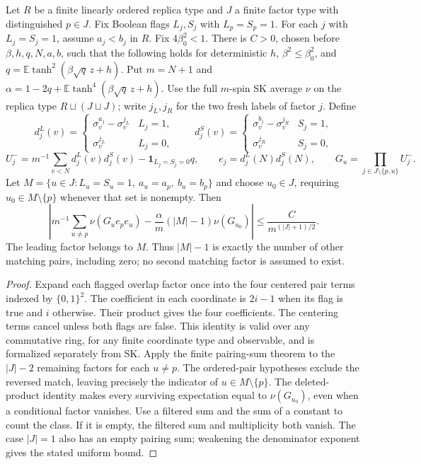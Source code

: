 \begin{theorem}
\label{thm:sg-tal:term-I-multiplicity}
\leanok
{}
Let $R$ be a finite linearly ordered replica type and $J$ a finite factor type with
distinguished $p\in J$. Fix Boolean flags $L_j,S_j$ with $L_p=S_p=1$.
For each $j$ with $L_j=S_j=1$, assume $a_j<b_j$ in $R$.
Fix $4\beta_0^2<1$. There is $C>0$, chosen before $\beta,h,q,N,a,b$, such that the
following holds for deterministic $h$, $\beta^2\le\beta_0^2$, and
$q=\mathbb E\tanh^2(\beta\sqrt q\,z+h)$. Put $m=N+1$ and
$\alpha=1-2q+\mathbb E\tanh^4(\beta\sqrt q\,z+h)$.
Use the full $m$-spin SK average $\nu$ on the replica type $R\sqcup(J\sqcup J)$;
write $j_L,j_R$ for the two fresh labels of factor $j$. Define
\[
 d_j^L(v)=\begin{cases}\sigma_v^{a_j}-\sigma_v^{j_L}&L_j=1,\\
                          \sigma_v^{j_L}&L_j=0,\end{cases}
 \qquad
 d_j^S(v)=\begin{cases}\sigma_v^{b_j}-\sigma_v^{j_R}&S_j=1,\\
                          \sigma_v^{j_R}&S_j=0,\end{cases}
\]
\[
 U_j^-=m^{-1}\sum_{v<N}d_j^L(v)d_j^S(v)
            -\mathbf1_{L_j=S_j=0}q,\qquad
 e_j=d_j^L(N)d_j^S(N),\qquad
 G_u=\prod_{j\in J\setminus\{p,u\}}U_j^-.
\]
Let $M=\{u\in J:L_u=S_u=1,\ a_u=a_p,\ b_u=b_p\}$ and choose $u_0\in J$,
requiring $u_0\in M\setminus\{p\}$ whenever that set is nonempty. Then
\[
 \left|m^{-1}\sum_{u\ne p}\nu(G_u e_p e_u)
       -\frac{\alpha}{m}(|M|-1)\nu(G_{u_0})\right|
 \le \frac{C}{m^{(|J|+1)/2}}.
\]
The leading factor belongs to $M$. Thus $|M|-1$ is exactly the number of other
matching pairs, including zero; no second matching factor is assumed to exist.
\end{theorem}
\begin{proof}
\leanok
Expand each flagged overlap factor once into the four centered pair terms indexed by
$\{0,1\}^2$. The coefficient in each coordinate is $2i-1$ when its flag is true
and $i$ otherwise. Their product gives the four coefficients. The centering terms
cancel unless both flags are false. This identity is valid over any commutative ring,
for any finite coordinate type and observable, and is formalized separately from SK.
Apply the finite pairing-sum theorem to the $|J|-2$ remaining factors for each $u\ne p$.
The ordered-pair hypotheses exclude the reversed match, leaving precisely the
indicator of $u\in M\setminus\{p\}$. The deleted-product identity makes every surviving
expectation equal to $\nu(G_{u_0})$, even when a conditional factor vanishes.
Use a filtered sum and the sum of a constant to count the class. If it is empty,
the filtered sum and multiplicity both vanish. The case $|J|=1$ also has an empty
pairing sum; weakening the denominator exponent gives the stated uniform bound.
\end{proof}

